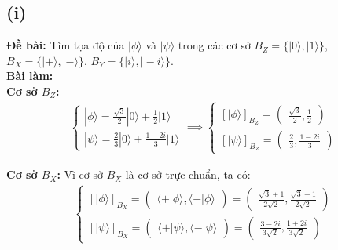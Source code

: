 \subsection{(i)}
\textbf{Đề bài:} Tìm tọa độ của $|\phi\rangle$ và $|\psi\rangle$ trong các cơ sở $B_{Z}=\{|0\rangle,|1\rangle\}$, $B_{X}=\{|+\rangle,|-\rangle\}$, $B_{Y}=\{|i\rangle,|-i\rangle\}$.\\
\textbf{Bài làm:}\\
\textbf{Cơ sở $B_{Z}$:}\\
\begin{align*}
    \begin{cases}
        |\phi\rangle = \frac{\sqrt{3}}{2}|0\rangle + \frac{1}{2}|1\rangle \\
        |\psi\rangle = \frac{2}{3}|0\rangle + \frac{1-2i}{3}|1\rangle
    \end{cases}
    \implies
    \begin{cases}
        [|\phi\rangle]_{B_{Z}} = \begin{pmatrix}
                                     \frac{\sqrt{3}}{2},
                                     \frac{1}{2}
                                 \end{pmatrix} \\
        [|\psi\rangle]_{B_{Z}} = \begin{pmatrix}
                                     \frac{2}{3},
                                     \frac{1-2i}{3}
                                 \end{pmatrix}
    \end{cases}
\end{align*}

\textbf{Cơ sở $B_{X}$:} Vì cơ sở $B_{X}$ là cơ sở trực chuẩn, ta có:
\begin{align*}
    \begin{cases}
        [|\phi\rangle]_{B_{X}} = \begin{pmatrix}
                                     \langle+|\phi\rangle,
                                     \langle-|\phi\rangle
                                 \end{pmatrix} = \begin{pmatrix}
                                                     \frac{\sqrt{3} + 1}{2\sqrt{2}},
                                                     \frac{\sqrt{3} - 1}{2\sqrt{2}}
                                                 \end{pmatrix} \\
        [|\psi\rangle]_{B_{X}} = \begin{pmatrix}
                                     \langle+|\psi\rangle,
                                     \langle-|\psi\rangle
                                 \end{pmatrix} = \begin{pmatrix}
                                                     \frac{3 - 2i}{3\sqrt{2}},
                                                     \frac{1 + 2i}{3\sqrt{2}}
                                                 \end{pmatrix}
    \end{cases}
\end{align*}

